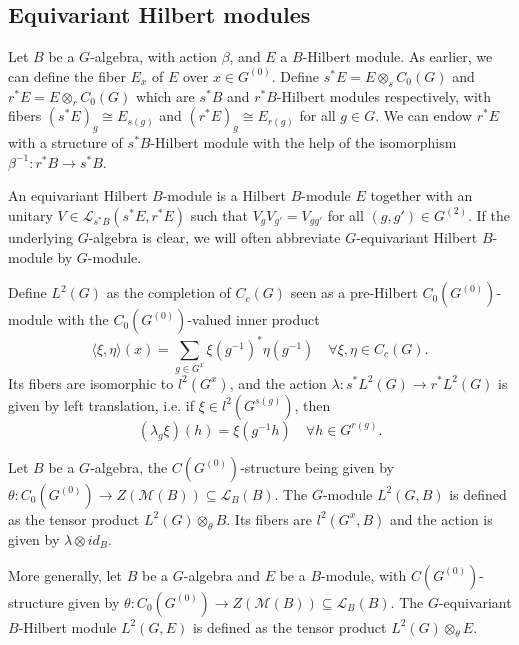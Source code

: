 
\subsection{Equivariant Hilbert modules}
Let $B$ be a $G$-algebra, with action $\beta$, and $E$ a $B$-Hilbert module. As earlier, we can define the fiber $E_x$ of $E$ over $x\in G^{(0)}$. Define $s^* E = E \otimes_s C_0(G)$ and $r^* E = E \otimes_r C_0(G)$ which are $s^*B$ and $r^*B$-Hilbert modules respectively, with fibers $(s^* E)_g \cong E_{s(g)}$ and $(r^* E)_g \cong E_{r(g)}$ for all $g\in G$. We can endow $r^*E$ with a structure of $s^* B$-Hilbert module with the help of the isomorphism $\beta^{-1} : r^* B\rightarrow s^* B$.

\begin{definition}
An equivariant Hilbert $B$-module is a Hilbert $B$-module $E$ together with an unitary $V\in\mathcal L_{s^* B}(s^*E ,r^* E)$ such that $V_gV_{g'} = V_{gg'}$ for all $(g,g')\in G^{(2)}$. If the underlying $G$-algebra is clear, we will often abbreviate $G$-equivariant Hilbert $B$-module by $G$-module.
\end{definition}

\begin{Expl} Define $L^2(G)$ as the completion of $C_c(G)$ seen as a pre-Hilbert $C_0(G^{(0)})$-module with the $C_0(G^{(0)})$-valued inner product 
\[\langle \xi ,\eta\rangle (x) = \sum_{g\in G^x} \xi(g^{-1})^*\eta(g^{-1}) \quad \forall \xi,\eta\in C_c(G).\]
Its fibers are isomorphic to $l^2(G^x)$, and the action $\lambda : s^*L^2(G) \rightarrow r^* L^2(G)$ is given by left translation, i.e. if $\xi\in l^2(G^{s(g)})$, then
\[(\lambda_g\xi)(h) = \xi(g^{-1}h)\quad \forall h\in G^{r(g)}.\]
\end{Expl}

\begin{Expl} Let $B$ be a $G$-algebra, the $C(G^{(0)})$-structure being given by $\theta : C_0(G^{(0)})\rightarrow Z(\mathcal M(B))\subseteq \mathcal L_B(B)$. The $G$-module $L^2(G,B)$ is defined as the tensor product $ L^2(G)\otimes_\theta B$. Its fibers are $l^2(G^x,B)$ and the action is given by $\lambda\otimes id_{B}$.
\end{Expl}

\begin{Expl} More generally, let $B$ be a $G$-algebra and $E$ be a $B$-module, with $C(G^{(0)})$-structure given by $\theta : C_0(G^{(0)})\rightarrow Z(\mathcal M(B))\subseteq \mathcal L_B(B)$. The $G$-equivariant $B$-Hilbert module $L^2(G,E)$ is defined as the tensor product $ L^2(G)\otimes_\theta E$.
\end{Expl}

